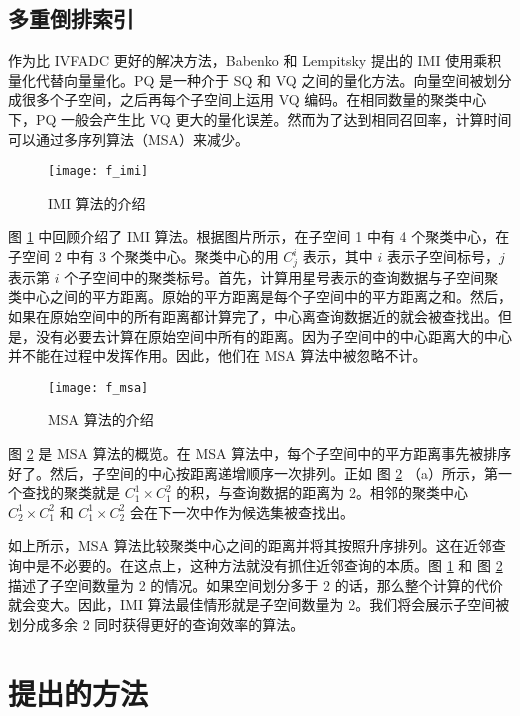 \subsection{多重倒排索引}
作为比 IVFADC 更好的解决方法，Babenko 和 Lempitsky 提出的 IMI 使用乘积量化代替向量量化。PQ 是一种介于 SQ 和 VQ 之间的量化方法。向量空间被划分成很多个子空间，之后再每个子空间上运用 VQ 编码。在相同数量的聚类中心下，PQ 一般会产生比 VQ 更大的量化误差。然而为了达到相同召回率，计算时间可以通过多序列算法（MSA）来减少。
\begin{figure}[H]
  \centering
  \texttt{[image: f\_imi]}
  \caption{IMI 算法的介绍}
  \label{fig:f_imi}
\end{figure}
图 \ref{fig:f_imi} 中回顾介绍了 IMI 算法。根据图片所示，在子空间 1 中有 4 个聚类中心，在子空间 2 中有 3 个聚类中心。聚类中心的用 $C_j^i$ 表示，其中 $i$ 表示子空间标号，$j$ 表示第 $i$ 个子空间中的聚类标号。首先，计算用星号表示的查询数据与子空间聚类中心之间的平方距离。原始的平方距离是每个子空间中的平方距离之和。然后，如果在原始空间中的所有距离都计算完了，中心离查询数据近的就会被查找出。但是，没有必要去计算在原始空间中所有的距离。因为子空间中的中心距离大的中心并不能在过程中发挥作用。因此，他们在 MSA 算法中被忽略不计。
\begin{figure}[H]
  \centering
  \texttt{[image: f\_msa]}
  \caption{MSA 算法的介绍}
  \label{fig:f_msa}
\end{figure}
图 \ref{fig:f_msa} 是 MSA 算法的概览。在 MSA 算法中，每个子空间中的平方距离事先被排序好了。然后，子空间的中心按距离递增顺序一次排列。正如 图 \ref{fig:f_msa} （a）所示，第一个查找的聚类就是 $C_1^1 \times C_1^2$ 的积，与查询数据的距离为 2。相邻的聚类中心 $C_2^1 \times C_1^2$ 和 $C_1^1 \times C_2^2$ 会在下一次中作为候选集被查找出。

如上所示，MSA 算法比较聚类中心之间的距离并将其按照升序排列。这在近邻查询中是不必要的。在这点上，这种方法就没有抓住近邻查询的本质。图 \ref{fig:f_imi} 和 图 \ref{fig:f_msa} 描述了子空间数量为 2 的情况。如果空间划分多于 2 的话，那么整个计算的代价就会变大。因此，IMI 算法最佳情形就是子空间数量为 2。我们将会展示子空间被划分成多余 2 同时获得更好的查询效率的算法。
\section{提出的方法}
